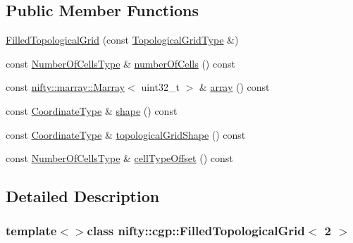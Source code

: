 \subsection*{Public Member Functions}
\begin{DoxyCompactItemize}
\item 
\hyperlink{classnifty_1_1cgp_1_1FilledTopologicalGrid_3_012_01_4_abdd8feabb36e019fb27d2a57c025ae06}{Filled\+Topological\+Grid} (const \hyperlink{classnifty_1_1cgp_1_1FilledTopologicalGrid_3_012_01_4_a18ed401fbaca132c3a3bce16c8f448a9}{Topological\+Grid\+Type} \&)
\item 
const \hyperlink{classnifty_1_1cgp_1_1FilledTopologicalGrid_3_012_01_4_a4026316cb9c7a8e6958cb32e6324ea7d}{Number\+Of\+Cells\+Type} \& \hyperlink{classnifty_1_1cgp_1_1FilledTopologicalGrid_3_012_01_4_aa0bafc4e448a5d9551da464232156f36}{number\+Of\+Cells} () const 
\item 
const \hyperlink{classandres_1_1Marray}{nifty\+::marray\+::\+Marray}$<$ uint32\+\_\+t $>$ \& \hyperlink{classnifty_1_1cgp_1_1FilledTopologicalGrid_3_012_01_4_a16fae761f377777dc3ab5b134af262ac}{array} () const 
\item 
const \hyperlink{classnifty_1_1cgp_1_1FilledTopologicalGrid_3_012_01_4_a744d1529d7bb50ca95236a5abaded0ad}{Coordinate\+Type} \& \hyperlink{classnifty_1_1cgp_1_1FilledTopologicalGrid_3_012_01_4_a5c90388d6330464471f952eb3c1b1513}{shape} () const 
\item 
const \hyperlink{classnifty_1_1cgp_1_1FilledTopologicalGrid_3_012_01_4_a744d1529d7bb50ca95236a5abaded0ad}{Coordinate\+Type} \& \hyperlink{classnifty_1_1cgp_1_1FilledTopologicalGrid_3_012_01_4_afd3218d481d3e9cb1ecf606435a89c2c}{topological\+Grid\+Shape} () const 
\item 
const \hyperlink{classnifty_1_1cgp_1_1FilledTopologicalGrid_3_012_01_4_a4026316cb9c7a8e6958cb32e6324ea7d}{Number\+Of\+Cells\+Type} \& \hyperlink{classnifty_1_1cgp_1_1FilledTopologicalGrid_3_012_01_4_a1ea2d0f4dd3c2db9780bac1740a3bc18}{cell\+Type\+Offset} () const 
\end{DoxyCompactItemize}


\subsection{Detailed Description}
\subsubsection*{template$<$$>$class nifty\+::cgp\+::\+Filled\+Topological\+Grid$<$ 2 $>$}

